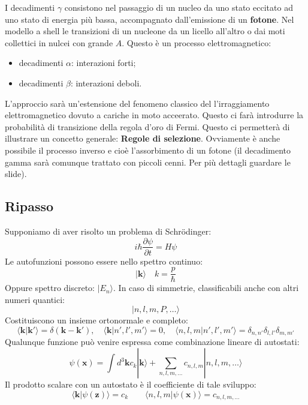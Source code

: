 I decadimenti $\gamma$ consistono nel passaggio di un nucleo da uno stato eccitato ad uno stato di energia più bassa, accompagnato dall'emissione di un \textbf{fotone}. Nel modello a shell le transizioni di un nucleone da un licello all'altro o dai moti collettici in nulcei con grande $A$. Questo è un processo elettromagnetico:
\begin{itemize}
    \item decadimenti $\alpha$: interazioni forti;
    \item decadimenti $\beta$: interazioni deboli.
\end{itemize}
L'approccio sarà un'estensione del fenomeno classico del l'irraggiamento elettromagnetico dovuto a cariche in moto acceerato. Questo ci farà introdurre la probabilità di transizione della regola d'oro di Fermi. Questo ci permetterà di illustrare un concetto generale: \textbf{Regole di selezione}. Ovviamente è anche possibile il processo inverso e cioè l'assorbimento di un fotone (il decadimento gamma sarà comunque trattato con piccoli cenni. Per più dettagli guardare le slide).
\subsection{Ripasso}
Supponiamo di aver risolto un problema di Schr\"odinger:
\begin{equation*}
    i\hbar\frac{\partial \psi}{\partial t}=H\psi
\end{equation*}
Le autofunzioni possono essere nello spettro continuo:
\begin{equation*}
    |\mathbf{k}\rangle\quad k=\frac{p}{\hbar}
\end{equation*}
Oppure spettro discreto: $|E_n\rangle$. In caso di simmetrie, classificabili anche con altri numeri quantici:
\begin{equation*}
    |n,l,m,P,\ldots\rangle
\end{equation*}
Costituiscono un insieme ortonormale e completo:
\begin{equation*}
    \langle\mathbf{k}|\mathbf{k}'\rangle=\delta(\mathbf{k}-\mathbf{k}'), \quad \langle\mathbf{k}|n',l',m'\rangle=0,\quad \langle n,l,m|n',l',m'\rangle=\delta_{n,n'}\delta_{l,l'}\delta_{m,m'}
\end{equation*}
Qualunque funzione può venire espressa come combinazione lineare di autostati:
\begin{equation*}
    \psi(\mathbf{x})=\int d^3\mathbf{k}c_k|\mathbf{k}\rangle +\sum_{n,l,m,\ldots}c_{n,l,m}|n,l,m,\ldots\rangle
\end{equation*}
Il prodotto scalare con un autostato è il coefficiente di tale sviluppo:
\begin{equation*}
    \langle\mathbf{k}|\psi(\mathbf{z})\rangle=c_k \qquad \langle n,l,m|\psi(\mathbf{x})\rangle=c_{n,l,m,\ldots}
\end{equation*}
